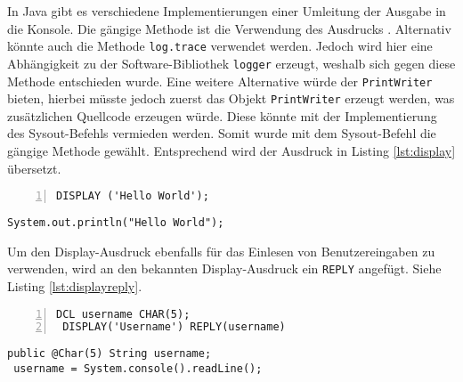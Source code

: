 In Java gibt es verschiedene Implementierungen einer Umleitung der Ausgabe in die Konsole.
Die gängige Methode ist die Verwendung des Ausdrucks . 
Alternativ könnte auch die Methode \verb+log.trace+ verwendet werden.
Jedoch wird hier eine Abhängigkeit zu der Software-Bibliothek \verb+logger+  erzeugt, weshalb sich gegen diese Methode entschieden wurde.
Eine weitere Alternative würde der \verb+PrintWriter+ bieten, hierbei müsste jedoch zuerst das Objekt \verb+PrintWriter+ erzeugt werden, was zusätzlichen Quellcode erzeugen würde. Diese könnte mit der Implementierung des Sysout-Befehls vermieden werden.
Somit wurde mit dem Sysout-Befehl die gängige Methode gewählt. Entsprechend wird der Ausdruck in Listing \ref{lst:display} übersetzt.

\begin{minipage}[b]{0.48\linewidth}
	\centering
	\lstset{language=PL/I,label=SliceExaple}
	\begin{lstlisting}[frame=single, numbers=left, mathescape,%
		caption={Standardausgabe}, label={lst:display}, basicstyle=\fontsize{9}{13}\selectfont\ttfamily]
 DISPLAY ('Hello World');
	\end{lstlisting}
\end{minipage}
\hspace{0.5cm}
\begin{minipage}[b]{0.48\linewidth}
	\centering
	\lstset{language=Java,label=SliceExaple}
	\begin{lstlisting}[frame=single, mathescape,%
		title={" "}, basicstyle=\fontsize{9}{13}\selectfont\ttfamily]
 System.out.println("Hello World");
	\end{lstlisting}
\end{minipage} 


Um den Display-Ausdruck ebenfalls für das Einlesen von Benutzereingaben zu verwenden, wird an den bekannten Display-Ausdruck ein \verb+REPLY+ angefügt. Siehe Listing \ref{lst:displayreply}.

\begin{minipage}[b]{0.48\linewidth}
	\centering
	\lstset{language=PL/I,label=SliceExaple}
	\begin{lstlisting}[frame=single, numbers=left, mathescape,%
		caption={Standardeingabe}, label={lst:displayreply}, basicstyle=\fontsize{9}{13}\selectfont\ttfamily]
 DCL username CHAR(5);
 DISPLAY('Username') REPLY(username)
	\end{lstlisting}
\end{minipage}
\hspace{0.5cm}
\begin{minipage}[b]{0.48\linewidth}
	\centering
	\lstset{language=Java,label=SliceExaple}
	\begin{lstlisting}[frame=single, mathescape,% 
	title={" "}, basicstyle=\fontsize{9}{13}\selectfont\ttfamily]
 public @Char(5) String username;
 username = System.console().readLine(); 
	\end{lstlisting}
\end{minipage} 

